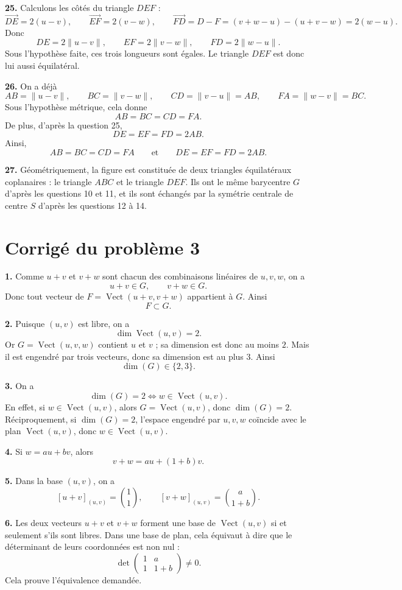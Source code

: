 \documentclass[11pt,a4paper]{article}
\newcommand{\Vect}{\operatorname{Vect}}
\newcommand{\dimv}{\operatorname{dim}}
\newcommand{\p}[1]{\medskip\noindent\textbf{#1.}}
\begin{document}
\p{25} Calculons les côtés du triangle $DEF$ :
\[
\overrightarrow{DE}=2(u-v),
\qquad
\overrightarrow{EF}=2(v-w),
\qquad
\overrightarrow{FD}=D-F=(v+w-u)-(u+v-w)=2(w-u).
\]
Donc
\[
DE=2\|u-v\|,
\qquad
EF=2\|v-w\|,
\qquad
FD=2\|w-u\|.
\]
Sous l'hypothèse faite, ces trois longueurs sont égales. Le triangle $DEF$ est donc lui aussi équilatéral.

\p{26} On a déjà
\[
AB=\|u-v\|,
\qquad
BC=\|v-w\|,
\qquad
CD=\|v-u\|=AB,
\qquad
FA=\|w-v\|=BC.
\]
Sous l'hypothèse métrique, cela donne
\[
AB=BC=CD=FA.
\]
De plus, d'après la question 25,
\[
DE=EF=FD=2AB.
\]
Ainsi,
\[
AB=BC=CD=FA
\qquad\text{et}\qquad
DE=EF=FD=2AB.
\]

\p{27} Géométriquement, la figure est constituée de deux triangles équilatéraux coplanaires : le triangle $ABC$ et le triangle $DEF$. Ils ont le même barycentre $G$ d'après les questions 10 et 11, et ils sont échangés par la symétrie centrale de centre $S$ d'après les questions 12 à 14.


\section*{Corrigé du problème 3}


\p{1} Comme $u+v$ et $v+w$ sont chacun des combinaisons linéaires de $u,v,w$, on a
\[
u+v\in G,
\qquad
v+w\in G.
\]
Donc tout vecteur de $F=\Vect(u+v,v+w)$ appartient à $G$. Ainsi
\[
F\subset G.
\]

\p{2} Puisque $(u,v)$ est libre, on a
\[
\dimv\Vect(u,v)=2.
\]
Or $G=\Vect(u,v,w)$ contient $u$ et $v$ ; sa dimension est donc au moins $2$. Mais il est engendré par trois vecteurs, donc sa dimension est au plus $3$.
Ainsi
\[
\dimv(G)\in\{2,3\}.
\]

\p{3} On a
\[
\dimv(G)=2
\iff w\in\Vect(u,v).
\]
En effet, si $w\in\Vect(u,v)$, alors $G=\Vect(u,v)$, donc $\dimv(G)=2$. Réciproquement, si $\dimv(G)=2$, l'espace engendré par $u,v,w$ coïncide avec le plan $\Vect(u,v)$, donc $w\in\Vect(u,v)$.

\p{4} Si $w=au+bv$, alors
\[
v+w=au+(1+b)v.
\]

\p{5} Dans la base $(u,v)$, on a
\[
[u+v]_{(u,v)}=\binom{1}{1},
\qquad
[v+w]_{(u,v)}=\binom{a}{1+b}.
\]

\p{6} Les deux vecteurs $u+v$ et $v+w$ forment une base de $\Vect(u,v)$ si et seulement s'ils sont libres. Dans une base de plan, cela équivaut à dire que le déterminant de leurs coordonnées est non nul :
\[
\det\begin{pmatrix}
1 & a\\
1 & 1+b
\end{pmatrix}\neq 0.
\]
Cela prouve l'équivalence demandée.
\end{document}

